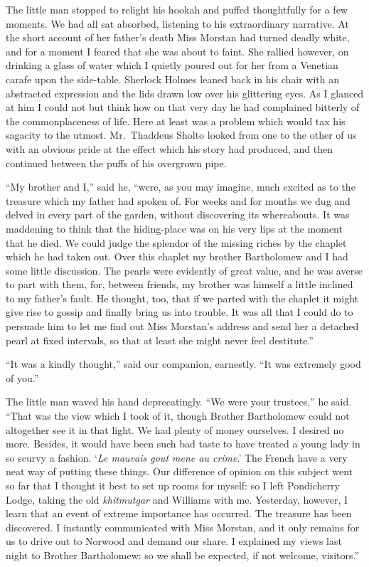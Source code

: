 \documentclass[12pt,english,oneside]{book}
\begin{document}
The little man stopped to relight his hookah and puffed thoughtfully
for a few moments. We had all sat absorbed, listening to his extraordinary
narrative. At the short account of her father's death Miss Morstan
had turned deadly white, and for a moment I feared that she was about
to faint. She rallied however, on drinking a glass of water which
I quietly poured out for her from a Venetian carafe upon the side-table.
Sherlock Holmes leaned back in his chair with an abstracted expression
and the lids drawn low over his glittering eyes. As I glanced at him
I could not but think how on that very day he had complained bitterly
of the commonplaceness of life. Here at least was a problem which
would tax his sagacity to the utmost. Mr.\ Thaddeus Sholto looked
from one to the other of us with an obvious pride at the effect which
his story had produced, and then continued between the puffs of his
overgrown pipe.

{}``My brother and I,'' said he, {}``were, as you may imagine,
much excited as to the treasure which my father had spoken of. For
weeks and for months we dug and delved in every part of the garden,
without discovering its whereabouts. It was maddening to think that
the hiding-place was on his very lips at the moment that he died.
We could judge the splendor of the missing riches by the chaplet which
he had taken out. Over this chaplet my brother Bartholomew and I had
some little discussion. The pearls were evidently of great value,
and he was averse to part with them, for, between friends, my brother
was himself a little inclined to my father's fault. He thought, too,
that if we parted with the chaplet it might give rise to gossip and
finally bring us into trouble. It was all that I could do to persuade
him to let me find out Miss Morstan's address and send her a detached
pearl at fixed intervals, so that at least she might never feel destitute.''

{}``It was a kindly thought,'' said our companion, earnestly. {}``It
was extremely good of you.''

The little man waved his hand deprecatingly. {}``We were your trustees,''
he said. {}``That was the view which I took of it, though Brother
Bartholomew could not altogether see it in that light. We had plenty
of money ourselves. I desired no more. Besides, it would have been
such bad taste to have treated a young lady in so scurvy a fashion.
`\emph{Le mauvais gout mene au crime}.' The French have a very neat
way of putting these things. Our difference of opinion on this subject
went so far that I thought it best to set up rooms for myself: so
I left Pondicherry Lodge, taking the old \emph{khitmutgar} and Williams
with me. Yesterday, however, I learn that an event of extreme importance
has occurred. The treasure has been discovered. I instantly communicated
with Miss Morstan, and it only remains for us to drive out to Norwood
and demand our share. I explained my views last night to Brother Bartholomew:
so we shall be expected, if not welcome, visitors.''
\end{document}
